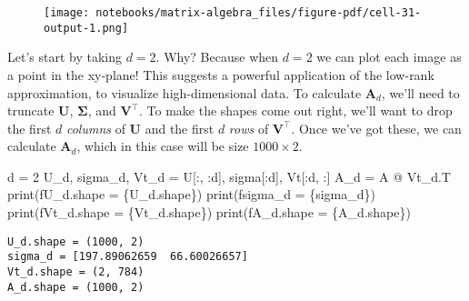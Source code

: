 \documentclass[
  letterpaper,
  DIV=11,
  numbers=noendperiod]{scrreprt}
\newenvironment{Shaded}{\begin{snugshade}}{\end{snugshade}}
\newcommand{\BuiltInTok}[1]{\textcolor[rgb]{0.00,0.23,0.31}{#1}}
\newcommand{\DecValTok}[1]{\textcolor[rgb]{0.68,0.00,0.00}{#1}}
\newcommand{\NormalTok}[1]{\textcolor[rgb]{0.00,0.23,0.31}{#1}}
\newcommand{\OperatorTok}[1]{\textcolor[rgb]{0.37,0.37,0.37}{#1}}
\newcommand{\SpecialCharTok}[1]{\textcolor[rgb]{0.37,0.37,0.37}{#1}}
\newcommand{\SpecialStringTok}[1]{\textcolor[rgb]{0.13,0.47,0.30}{#1}}
\begin{document}
\begin{figure}[H]

{\centering \texttt{[image: notebooks/matrix-algebra\_files/figure-pdf/cell-31-output-1.png]}

}

\end{figure}

Let's start by taking \(d=2\). Why? Because when \(d=2\) we can plot
each image as a point in the xy-plane! This suggests a powerful
application of the low-rank approximation, to visualize high-dimensional
data. To calculate \(\mathbf{A}_d\), we'll need to truncate
\(\mathbf{U}\), \(\mathbf{\Sigma}\), and \(\mathbf{V}^\top\). To make
the shapes come out right, we'll want to drop the first \(d\)
\emph{columns} of \(\mathbf{U}\) and the first \(d\) \emph{rows} of
\(\mathbf{V}^\top\). Once we've got these, we can calculate
\(\mathbf{A}_d\), which in this case will be size \(1000 \times 2\).

\begin{Shaded}
\begin{Highlighting}[]
\NormalTok{d }\OperatorTok{=} \DecValTok{2}
\NormalTok{U\_d, sigma\_d, Vt\_d }\OperatorTok{=}\NormalTok{ U[:, :d], sigma[:d], Vt[:d, :]}
\NormalTok{A\_d }\OperatorTok{=}\NormalTok{ A }\OperatorTok{@}\NormalTok{ Vt\_d.T}
\BuiltInTok{print}\NormalTok{(}\SpecialStringTok{f\textquotesingle{}U\_d.shape = }\SpecialCharTok{\{}\NormalTok{U\_d}\SpecialCharTok{.}\NormalTok{shape}\SpecialCharTok{\}}\SpecialStringTok{\textquotesingle{}}\NormalTok{)}
\BuiltInTok{print}\NormalTok{(}\SpecialStringTok{f\textquotesingle{}sigma\_d = }\SpecialCharTok{\{}\NormalTok{sigma\_d}\SpecialCharTok{\}}\SpecialStringTok{\textquotesingle{}}\NormalTok{)}
\BuiltInTok{print}\NormalTok{(}\SpecialStringTok{f\textquotesingle{}Vt\_d.shape = }\SpecialCharTok{\{}\NormalTok{Vt\_d}\SpecialCharTok{.}\NormalTok{shape}\SpecialCharTok{\}}\SpecialStringTok{\textquotesingle{}}\NormalTok{)}
\BuiltInTok{print}\NormalTok{(}\SpecialStringTok{f\textquotesingle{}A\_d.shape = }\SpecialCharTok{\{}\NormalTok{A\_d}\SpecialCharTok{.}\NormalTok{shape}\SpecialCharTok{\}}\SpecialStringTok{\textquotesingle{}}\NormalTok{)}
\end{Highlighting}
\end{Shaded}

\begin{verbatim}
U_d.shape = (1000, 2)
sigma_d = [197.89062659  66.60026657]
Vt_d.shape = (2, 784)
A_d.shape = (1000, 2)
\end{verbatim}
\end{document}
